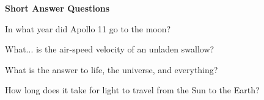 \documentclass[10pt,answers,addpoints]{exam}
\begin{document}
\begin{questions}
\begin{minipage}{\linewidth}
\begin{solutionbox}{0in}
\end{solutionbox}
\end{minipage}





\newpage
\begin{center}
{\Large \textbf{Short Answer Questions}}
\end{center}

\par\vspace{0.100000in}\begin{minipage}{\linewidth}
\vspace{.35cm}\question[2]
In what year did Apollo 11 go to the moon?
\vspace{.25cm}\setlength\answerlinelength{3in}
\answerline[1969]
\end{minipage}


\par\vspace{0.100000in}\begin{minipage}{\linewidth}
\vspace{.35cm}\question[2]
What... is the air-speed velocity of an unladen swallow?
\vspace{.25cm}\setlength\answerlinelength{3in}
\end{minipage}


\par\vspace{0.100000in}\begin{minipage}{\linewidth}
\vspace{.35cm}\question[2]
What is the answer to life, the universe, and everything?
\vspace{.25cm}\setlength\answerlinelength{3in}
\answerline[42]
\end{minipage}


\par\vspace{0.100000in}\begin{minipage}{\linewidth}
\vspace{.35cm}\question[2]
How long does it take for light to travel from the Sun to the Earth?
\vspace{.25cm}\setlength\answerlinelength{3in}
\answerline[8 minutes]
\end{minipage}



\end{questions}
\end{document}
